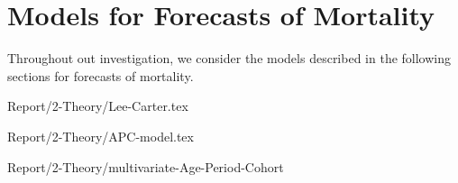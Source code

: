 \newpage
\section{Models for Forecasts of Mortality}
\label{sec:ModelsPopulationDevelopment}

Throughout out investigation, we consider the models described in the following sections for forecasts of mortality. 

{Report/2-Theory/Lee-Carter.tex}

{Report/2-Theory/APC-model.tex}

{Report/2-Theory/multivariate-Age-Period-Cohort}